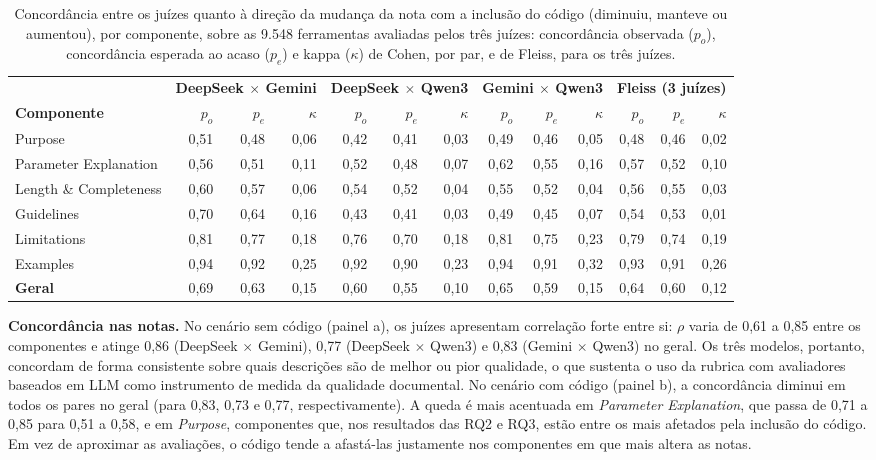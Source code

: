 \begin{table}[H]
\centering
\caption{Concordância entre os juízes quanto à direção da mudança da nota com a inclusão do código (diminuiu, manteve ou aumentou), por componente, sobre as 9.548 ferramentas avaliadas pelos três juízes: concordância observada ($p_o$), concordância esperada ao acaso ($p_e$) e kappa ($\kappa$) de Cohen, por par, e de Fleiss, para os três juízes.}
\label{tab:kappa-direcao}
\scriptsize
\setlength{\tabcolsep}{2.5pt}
\begin{tabular}{lrrrrrrrrrrrr}
\toprule
 & \multicolumn{3}{c}{\textbf{DeepSeek $\times$ Gemini}} & \multicolumn{3}{c}{\textbf{DeepSeek $\times$ Qwen3}} & \multicolumn{3}{c}{\textbf{Gemini $\times$ Qwen3}} & \multicolumn{3}{c}{\textbf{Fleiss (3 juízes)}} \\
\cmidrule(lr){2-4} \cmidrule(lr){5-7} \cmidrule(lr){8-10} \cmidrule(lr){11-13}
\textbf{Componente} & $p_o$ & $p_e$ & $\kappa$ & $p_o$ & $p_e$ & $\kappa$ & $p_o$ & $p_e$ & $\kappa$ & $p_o$ & $p_e$ & $\kappa$ \\
\midrule
Purpose & 0,51 & 0,48 & 0,06 & 0,42 & 0,41 & 0,03 & 0,49 & 0,46 & 0,05 & 0,48 & 0,46 & 0,02 \\
Parameter Explanation & 0,56 & 0,51 & 0,11 & 0,52 & 0,48 & 0,07 & 0,62 & 0,55 & 0,16 & 0,57 & 0,52 & 0,10 \\
Length \& Completeness & 0,60 & 0,57 & 0,06 & 0,54 & 0,52 & 0,04 & 0,55 & 0,52 & 0,04 & 0,56 & 0,55 & 0,03 \\
Guidelines & 0,70 & 0,64 & 0,16 & 0,43 & 0,41 & 0,03 & 0,49 & 0,45 & 0,07 & 0,54 & 0,53 & 0,01 \\
Limitations & 0,81 & 0,77 & 0,18 & 0,76 & 0,70 & 0,18 & 0,81 & 0,75 & 0,23 & 0,79 & 0,74 & 0,19 \\
Examples & 0,94 & 0,92 & 0,25 & 0,92 & 0,90 & 0,23 & 0,94 & 0,91 & 0,32 & 0,93 & 0,91 & 0,26 \\
\midrule
\textbf{Geral} & 0,69 & 0,63 & 0,15 & 0,60 & 0,55 & 0,10 & 0,65 & 0,59 & 0,15 & 0,64 & 0,60 & 0,12 \\
\bottomrule
\end{tabular}
\end{table}

\textbf{Concordância nas notas.} No cenário sem código (painel a), os juízes apresentam correlação forte entre si: $\rho$ varia de 0,61 a 0,85 entre os componentes e atinge 0,86 (DeepSeek $\times$ Gemini), 0,77 (DeepSeek $\times$ Qwen3) e 0,83 (Gemini $\times$ Qwen3) no geral. Os três modelos, portanto, concordam de forma consistente sobre quais descrições são de melhor ou pior qualidade, o que sustenta o uso da rubrica com avaliadores baseados em LLM como instrumento de medida da qualidade documental. No cenário com código (painel b), a concordância diminui em todos os pares no geral (para 0,83, 0,73 e 0,77, respectivamente). A queda é mais acentuada em \textit{Parameter Explanation}, que passa de 0,71 a 0,85 para 0,51 a 0,58, e em \textit{Purpose}, componentes que, nos resultados das RQ2 e RQ3, estão entre os mais afetados pela inclusão do código. Em vez de aproximar as avaliações, o código tende a afastá-las justamente nos componentes em que mais altera as notas.

